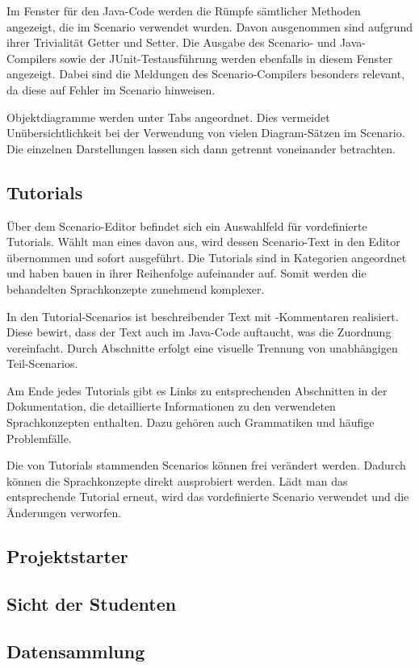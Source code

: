 Im Fenster für den Java-Code werden die Rümpfe sämtlicher Methoden angezeigt, die im Scenario verwendet wurden.
Davon ausgenommen sind aufgrund ihrer Trivialität Getter und Setter.
Die Ausgabe des Scenario- und Java-Compilers sowie der JUnit-Testausführung werden ebenfalls in diesem Fenster angezeigt.
Dabei sind die Meldungen des Scenario-Compilers besonders relevant, da diese auf Fehler im Scenario hinweisen.

Objektdiagramme werden unter Tabs angeordnet.
Dies vermeidet Unübersichtlichkeit bei der Verwendung von vielen Diagram-Sätzen im Scenario.
Die einzelnen Darstellungen lassen sich dann getrennt voneinander betrachten.

\subsection{Tutorials}\label{subsec:tutorials}

Über dem Scenario-Editor befindet sich ein Auswahlfeld für vordefinierte Tutorials.
Wählt man eines davon aus, wird dessen Scenario-Text in den Editor übernommen und sofort ausgeführt.
Die Tutorials sind in Kategorien angeordnet und haben bauen in ihrer Reihenfolge aufeinander auf.
Somit werden die behandelten Sprachkonzepte zunehmend komplexer.

In den Tutorial-Scenarios ist beschreibender Text mit \code{//}-Kommentaren realisiert.
Diese bewirt, dass der Text auch im Java-Code auftaucht, was die Zuordnung vereinfacht.
Durch Abschnitte erfolgt eine visuelle Trennung von unabhängigen Teil-Scenarios.

Am Ende jedes Tutorials gibt es Links zu entsprechenden Abschnitten in der Dokumentation,
die detaillierte Informationen zu den verwendeten Sprachkonzepten enthalten.
Dazu gehören auch Grammatiken und häufige Problemfälle.

Die von Tutorials stammenden Scenarios können frei verändert werden.
Dadurch können die Sprachkonzepte direkt ausprobiert werden.
Lädt man das entsprechende Tutorial erneut, wird das vordefinierte Scenario verwendet und die Änderungen verworfen.

\subsection{Projektstarter}\label{subsec:project-starter}


\subsection{Sicht der Studenten}\label{subsec:students-view}


\subsection{Datensammlung}\label{subsec:data-collection}

